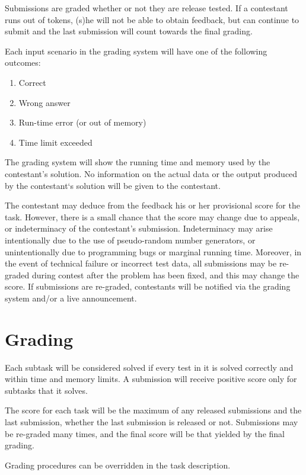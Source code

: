 \documentclass[a5paper,10pt,twoside]{book}
\begin{document}
Submissions are graded whether or not they are release tested. If a contestant
runs out of tokens, (s)he will not be able to obtain feedback, but can continue
to submit and the last submission will count towards the final grading.

Each input scenario in the grading system will have one of the following
outcomes:

\begin{enumerate}
    \item Correct
    \item Wrong answer
    \item Run-time error (or out of memory)
    \item Time limit exceeded
\end{enumerate}

The grading system will show the running time and memory used by the
contestant’s solution. No information on the actual data or the output produced
by the contestant‘s solution will be given to the contestant.

The contestant may deduce from the feedback his or her provisional score for the
task. However, there is a small chance that the score may change due to appeals,
or indeterminacy of the contestant’s submission. Indeterminacy may arise
intentionally due to the use of pseudo-random number generators, or
unintentionally due to programming bugs or marginal running time. Moreover, in
the event of technical failure or incorrect test data, all submissions may be
re-graded during contest after the problem has been fixed, and this may change
the score. If submissions are re-graded, contestants will be notified via the
grading system and/or a live announcement.

\section{Grading}

Each subtask will be considered solved if every test in it is solved correctly
and within time and memory limits. A submission will receive positive score only
for subtasks that it solves.

The score for each task will be the maximum of any released submissions and the
last submission, whether the last submission is released or not. Submissions may
be re-graded many times, and the final score will be that yielded by the final
grading.

Grading procedures can be overridden in the task description.
\end{document}
